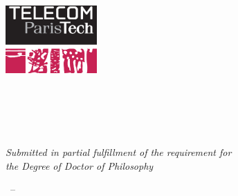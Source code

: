 \begin{titlepage}
    \begin{addmargin}[-1cm]{-3cm}
    \begin{center}
		\large
        \hfill

        \vfill

        \begingroup
            \LARGE \color{Maroon}\spacedallcaps{\myTitle} \\ \bigskip 
            \mySubtitle \\ \bigskip
        \endgroup
        
		\vfill  		
  		
		\includegraphics[width=3.5cm]{gfx/telecom.eps} \\ \bigskip
        
        \vfill
        
        {\Large \spacedlowsmallcaps{\myName}}\\ \medskip           
        
        \myDepartment \\                            
        \myUni \\ \bigskip
        
        \vfill
        \textit{Submitted in partial fulfillment of the requirement for\\
        the Degree of Doctor of Philosophy} 
        \vfill                      
        
    \end{center}
  \myTime\ -- \myVersion 
  \end{addmargin}       
\end{titlepage}   